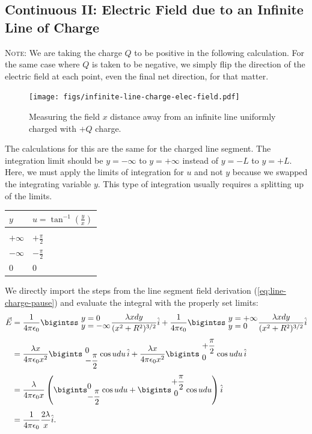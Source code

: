 \documentclass[12pt,b4paper]{article}
\begin{document}
\subsection{Continuous II: Electric Field due to an Infinite Line of Charge}
\textsc{Note}: We are taking the charge $Q$ to be positive in the following calculation. For the same case where $Q$ is taken to be negative, we simply flip the direction of the electric field at each point, even the final net direction, for that matter.
\begin{figure}[H]
    \centering
    \texttt{[image: figs/infinite-line-charge-elec-field.pdf]}
    \caption{Measuring the field $x$ distance away from an infinite line uniformly charged with $+Q$ charge.}
    \label{fig:infinite-line-charge-elec-field}
\end{figure}
The calculations for this are the same for the charged line segment. The integration limit should be $y=-\infty$ to $y=+\infty$ instead of $y=-L$ to $y=+L$. Here, we must apply the limits of integration for $u$ and not $y$ because we swapped the integrating variable $y$. This type of integration usually requires a splitting up of the limits.
\begin{table}[H]
    \centering
    \begin{tabular}{P{1.0cm}|P{3.0cm}}
    $y$ & $\displaystyle u=\tan^{-1}\left(\frac{y}{x}\right)$ \\[8pt]\hline\hline\\
    $+\infty$ & $\displaystyle+\frac{\pi}{2}$\\[10pt]
    $-\infty$ & $\displaystyle-\frac{\pi}{2}$\\[15pt]
    $0$ & $\displaystyle0$\\
\end{tabular}
\end{table}
We directly import the steps from the line segment field derivation (\ref{eq:line-charge-pause}) and evaluate the integral with the properly set limits:
\begin{align*} 
    \vec{E}&= \dfrac{1}{4 \pi \epsilon_0} \bigintss_{\displaystyle\,\,y=-\infty}^{\displaystyle\,\,y=0}\dfrac{\lambda xdy}{(x^2 + R^2)^{3/2}} \hat{i}+\dfrac{1}{4 \pi \epsilon_0} \bigintss_{\displaystyle\,\,y=0}^{\displaystyle\,\,y=+\infty}\dfrac{\lambda xdy}{(x^2 + R^2)^{3/2}} \hat{i} \\[4pt]
    &=\frac{\lambda x}{4\pi\epsilon_0x^2}\bigints_{\displaystyle\,\,-\frac{\pi}{2}}^{\displaystyle\,\,0}\cos{u}{du}\,\hat{i}+\frac{\lambda x}{4\pi\epsilon_0x^2}\bigints_{\displaystyle \,\,0}^{\displaystyle\,\,+\frac{\pi}{2}}\cos{u}{du}\,\hat{i} \\[4pt]
    &=\frac{\lambda}{4\pi\epsilon_0x}\left(\bigints_{\displaystyle-\frac{\pi}{2}}^{\displaystyle 0}\cos{u}{du}+\bigints_{\displaystyle \,\,0}^{\displaystyle+\frac{\pi}{2}}\cos{u}{du}\right)\hat{i}\notag\\[4pt]
    &=\dfrac{1}{4 \pi \epsilon_0}\frac{2\lambda}{x}\hat{i}.
\end{align*}
\end{document}
